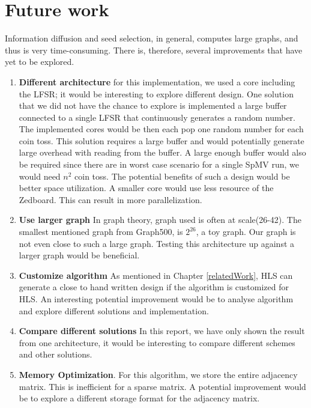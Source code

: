 \chapter{Future work} \label{futureWork}
Information diffusion and seed selection, in general, computes large graphs, and thus is very time-consuming. There is, therefore, several improvements that have yet to be explored.

\begin{enumerate}
\item \textbf{Different architecture} for this implementation, we used a core including the LFSR; it would be interesting to explore different design. One solution that we did not have the chance to explore is implemented a large buffer connected to a single LFSR that continuously generates a random number. The implemented cores would be then each pop one random number for each coin toss. This solution requires a large buffer and would potentially generate large overhead with reading from the buffer. A large enough buffer would also be required since there are in worst case scenario for a single SpMV run, we would need $n^2$ coin toss. The potential benefits of such a design would be better space utilization. A smaller core would use less resource of the Zedboard. This can result in more parallelization.

\item \textbf{Use larger graph} In graph theory, graph used is often at scale(26-42). The smallest mentioned graph from Graph500, is $2^{26}$, a toy graph. Our graph is not even close to such a large graph. Testing this architecture up against a larger graph would be beneficial. 

\item \textbf{Customize algorithm} As mentioned in Chapter \ref{relatedWork}, HLS can generate a close to hand written design if the algorithm is customized for HLS. An interesting potential improvement would be to analyse algorithm and explore different solutions and implementation.

\item \textbf{Compare different solutions} In this report, we have only shown the result from one architecture, it would be interesting to compare different schemes and other solutions. 

\item \textbf{Memory Optimization}. For this algorithm, we store the entire adjacency matrix. This is inefficient for a sparse matrix. A potential improvement would be to explore a different storage format for the adjacency matrix.


\end{enumerate}
